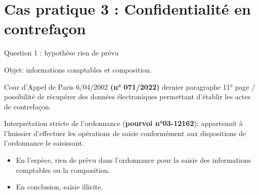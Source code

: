 
\section[Cas 3]{Cas pratique 3 : Confidentialité en
contrefaçon}

\begin{frame}{Question 1 : hypothèse rien de prévu}

Objet: informations comptables et composition.

\begin{block}{}
Cour d’Appel de Paris 6/04/2002 \textbf{(n° 071/2022)} dernier paragraphe 11° page
/ possibilité de récupérer des données électroniques
 permettant d’établir les actes de contrefaçon.
\end{block}
\begin{block}{}
Interprétation stricte de l'ordonnance (\textbf{pourvoi n°03-12162}):
appartenait à l'huissier d'effectuer les opérations de saisie 
conformément aux dispositions de l'ordonnance le saisissant.
\end{block}

\begin{itemize}
    \item En l'espèce, rien de prévu dans l'ordonnance pour la
    saisie des informations comptables ou la composition.
    \item En conclusion, saisie illicite.
\end{itemize}

\end{frame}


